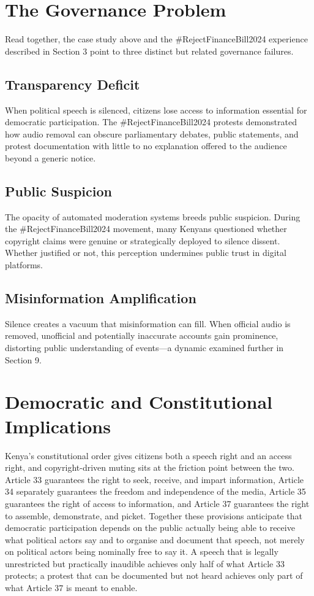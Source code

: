 \documentclass{article}
\begin{document}
\section{The Governance Problem}

Read together, the case study above and the \#RejectFinanceBill2024 experience described in Section 3 point to three distinct but related governance failures.

\subsection{Transparency Deficit}

When political speech is silenced, citizens lose access to information essential for democratic participation. The \#RejectFinanceBill2024 protests demonstrated how audio removal can obscure parliamentary debates, public statements, and protest documentation with little to no explanation offered to the audience beyond a generic notice.

\subsection{Public Suspicion}

The opacity of automated moderation systems breeds public suspicion. During the \#RejectFinanceBill2024 movement, many Kenyans questioned whether copyright claims were genuine or strategically deployed to silence dissent. Whether justified or not, this perception undermines public trust in digital platforms.

\subsection{Misinformation Amplification}

Silence creates a vacuum that misinformation can fill. When official audio is removed, unofficial and potentially inaccurate accounts gain prominence, distorting public understanding of events—a dynamic examined further in Section 9.

\section{Democratic and Constitutional Implications}

Kenya's constitutional order gives citizens both a speech right and an access right, and copyright-driven muting sits at the friction point between the two. Article 33 guarantees the right to seek, receive, and impart information, Article 34 separately guarantees the freedom and independence of the media,\cite{cipesa2025} Article 35 guarantees the right of access to information, and Article 37 guarantees the right to assemble, demonstrate, and picket. Together these provisions anticipate that democratic participation depends on the public actually being able to receive what political actors say and to organise and document that speech, not merely on political actors being nominally free to say it. A speech that is legally unrestricted but practically inaudible achieves only half of what Article 33 protects; a protest that can be documented but not heard achieves only part of what Article 37 is meant to enable.
\end{document}
